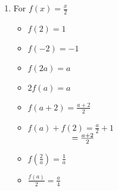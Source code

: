 \begin{enumerate}
\begin{multicols}{3}
\begin{itemize}
\vfill

\columnbreak

\item $\frac{f(a)}{2} = \frac{117}{2}$

\vfill

\columnbreak


\item  $f(a + h) = 117$

\end{itemize}
\end{multicols}



\item For $f(x) = \frac{x}{2}$

\begin{multicols}{3}
\begin{itemize}

\item  $f(2) = 1$
\item  $f(-2) = -1$
\item  $f(2a) = a$

\end{itemize}
\end{multicols}

\begin{multicols}{3}
\begin{itemize}

\item  $2 f(a) = a$

\item $f(a+2) = \frac{a+2}{2}$

\vfill

\columnbreak

\item $f(a) + f(2) = \frac{a}{2}+ 1$ \\
      $\hphantom{f(a) + f(2)} = \frac{a+2}{2}$

\end{itemize}
\end{multicols}

\begin{multicols}{3}
\begin{itemize}

\item  $f \left( \frac{2}{a} \right) = \frac{1}{a}$

\vfill

\columnbreak

\item $\frac{f(a)}{2} =  \frac{a}{4}$


\end{itemize}
\end{multicols}
\end{enumerate}
